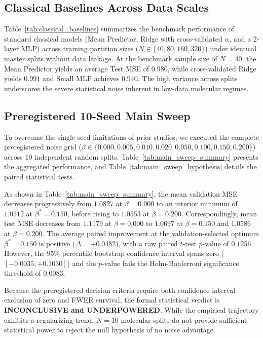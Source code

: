 \documentclass[sn-apacite,Numbered]{sn-jnl}
\begin{document}


\subsection{Classical Baselines Across Data Scales}
Table~\ref{tab:classical_baselines} summarizes the benchmark performance of standard classical models (Mean Predictor, Ridge with cross-validated $\alpha$, and a 2-layer MLP) across training partition sizes ($N \in \{40, 80, 160, 320\}$) under identical master splits without data leakage.
At the benchmark sample size of $N=40$, the Mean Predictor yields an average Test MSE of $0.980$, while cross-validated Ridge yields $0.991$ and Small MLP achieves $0.940$. The high variance across splits underscores the severe statistical noise inherent in low-data molecular regimes.



\subsection{Preregistered 10-Seed Main Sweep}

To overcome the single-seed limitations of prior studies, we executed the complete preregistered noise grid ($\beta \in \{0.000, 0.005, 0.010, 0.020, 0.050, 0.100, 0.150, 0.200\}$) across 10 independent random splits. Table~\ref{tab:main_sweep_summary} presents the aggregated performance, and Table~\ref{tab:main_sweep_hypothesis} details the paired statistical tests.




As shown in Table~\ref{tab:main_sweep_summary}, the mean validation MSE decreases progressively from $1.0827$ at $\beta=0.000$ to an interior minimum of $1.0512$ at $\beta^* = 0.150$, before rising to $1.0553$ at $\beta=0.200$. 
Correspondingly, mean test MSE decreases from $1.1179$ at $\beta=0.000$ to $1.0697$ at $\beta=0.150$ and $1.0586$ at $\beta=0.200$. 
The average paired improvement at the validation-selected optimum $\beta^* = 0.150$ is positive ($\bar{\Delta} = +0.0482$), with a raw paired $t$-test $p$-value of $0.1256$. However, the 95\% percentile bootstrap confidence interval spans zero ($[-0.0035, +0.1030]$) and the $p$-value fails the Holm-Bonferroni significance threshold of $0.0083$. 

Because the preregistered decision criteria require both confidence interval exclusion of zero and FWER survival, the formal statistical verdict is \textbf{INCONCLUSIVE and UNDERPOWERED}. While the empirical trajectory exhibits a regularizing trend, $N=10$ molecular splits do not provide sufficient statistical power to reject the null hypothesis of no noise advantage.
\end{document}
